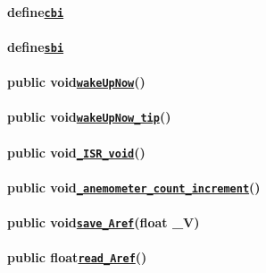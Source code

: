 \paragraph*{{\ttfamily define}\href{#Logger_8cpp_1ae70baf5399951da1e7ad45a0ed890832}{\tt {\ttfamily cbi}}}

\paragraph*{{\ttfamily define}\href{#Logger_8cpp_1ac4a5536d9bf092116f88b94797ddc882}{\tt {\ttfamily sbi}}}

\paragraph*{{\ttfamily public void}\href{#Logger_8cpp_1adee29828901ea1b4f99ce305fa3e17bd}{\tt {\ttfamily wake\+Up\+Now}}{\ttfamily ()}}

\paragraph*{{\ttfamily public void}\href{#Logger_8cpp_1a1a3b380e75d68eef4c3913816773e1b5}{\tt {\ttfamily wake\+Up\+Now\+\_\+tip}}{\ttfamily ()}}

\paragraph*{{\ttfamily public void}\href{#Logger_8cpp_1a9c215a00c214c880d04481d256d8d522}{\tt {\ttfamily \+\_\+\+I\+S\+R\+\_\+void}}{\ttfamily ()}}

\paragraph*{{\ttfamily public void}\href{#Logger_8cpp_1aa2e4ccb5b638347db4da535aac7ac209}{\tt {\ttfamily \+\_\+anemometer\+\_\+count\+\_\+increment}}{\ttfamily ()}}

\paragraph*{{\ttfamily public void}\href{#Logger_8cpp_1a144189fccfe80979cc2fcafefdf2728a}{\tt {\ttfamily save\+\_\+\+Aref}}{\ttfamily (float \+\_\+V)}}

\paragraph*{{\ttfamily public float}\href{#Logger_8cpp_1ae9bf4d0d2809a902be80dbf825844636}{\tt {\ttfamily read\+\_\+\+Aref}}{\ttfamily ()}}

